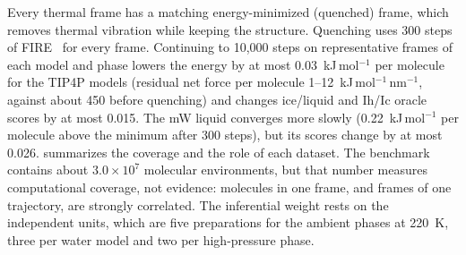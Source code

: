 \documentclass[11pt,a4paper]{article}
\begin{document}
Every thermal frame has a matching energy-minimized (quenched) frame, which
removes thermal vibration while keeping the structure. Quenching uses 300
steps of FIRE~\cite{Bitzek2006} for every frame. Continuing to 10,000 steps on
representative frames of each model and phase lowers the energy by at most
0.03~kJ\,mol$^{-1}$ per molecule for the TIP4P models (residual net force per
molecule 1--12~kJ\,mol$^{-1}$\,nm$^{-1}$, against about 450 before quenching)
and changes ice/liquid and Ih/Ic oracle scores by at most 0.015. The mW liquid
converges more slowly (0.22~kJ\,mol$^{-1}$ per molecule above the minimum
after 300 steps), but its scores change by at most 0.026. 
summarizes the coverage and the role of each dataset. The benchmark contains
about $3.0\times10^7$ molecular environments, but that number measures
computational coverage, not evidence: molecules in one frame, and frames of
one trajectory, are strongly correlated. The inferential weight rests on the
independent units, which are five preparations for the ambient phases at
220~K, three per water model and two per high-pressure phase.
\end{document}
